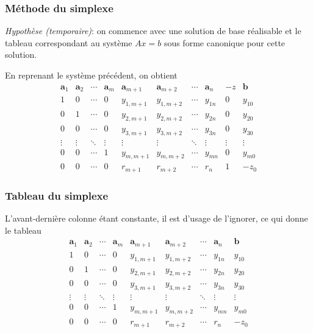 \documentclass[t,usepdftitle=false]{beamer}
\def\ba{\boldsymbol{a}}
\def\bb{\boldsymbol{b}}
\begin{document}
\begin{frame}
\frametitle{Méthode du simplexe}

\textit{Hypothèse (temporaire)}: on commence avec une solution de base réalisable et le tableau correspondant au système $Ax = b$ sous forme canonique pour cette solution.

\mbox{}

En reprenant le système précédent, on obtient
$$
\begin{matrix}
\ba_1 & \ba_2 & \cdots & \ba_m & \ba_{m+1} &
\ba_{m+2} & \cdots & \ba_n & -z & \bb \\
1 & 0 & \cdots & 0 & y_{1,m+1} & y_{1,m+2} & \cdots & y_{1n} & 0 & y_{10} \\
0 & 1 & \cdots & 0 & y_{2,m+1} & y_{2,m+2} & \cdots & y_{2n} & 0 & y_{20} \\
0 & 0 & \cdots & 0 & y_{3,m+1} & y_{3,m+2} & \cdots & y_{3n} & 0 & y_{30} \\
\vdots & \vdots & \ddots & \vdots & \vdots & \vdots & \ddots & \vdots & \vdots & \vdots \\
0 & 0 & \cdots & 1 & y_{m,m+1} & y_{m,m+2} & \cdots & y_{mn} & 0 & y_{m0} \\
0 & 0 & \cdots & 0 & r_{m+1} & r_{m+2} & \cdots & r_n & 1 & -z_0
\end{matrix}
$$

\end{frame}

\begin{frame}
\frametitle{Tableau du simplexe}

L'avant-dernière colonne étant constante, il est d'usage de l'ignorer, ce qui donne le tableau
$$
\begin{matrix}
	\ba_1 & \ba_2 & \cdots & \ba_m & \ba_{m+1} &
	\ba_{m+2} & \cdots & \ba_n & \bb \\
	1 & 0 & \cdots & 0 & y_{1,m+1} & y_{1,m+2} & \cdots & y_{1n} & y_{10} \\
	0 & 1 & \cdots & 0 & y_{2,m+1} & y_{2,m+2} & \cdots & y_{2n} & y_{20} \\
	0 & 0 & \cdots & 0 & y_{3,m+1} & y_{3,m+2} & \cdots & y_{3n} & y_{30} \\
	\vdots & \vdots & \ddots & \vdots & \vdots & \vdots & \ddots & \vdots & \vdots \\
	0 & 0 & \cdots & 1 & y_{m,m+1} & y_{m,m+2} & \cdots & y_{mn} & y_{m0} \\
	0 & 0 & \cdots & 0 & r_{m+1} & r_{m+2} & \cdots & r_n & -z_0
\end{matrix}
$$

\end{frame}
\end{document}
